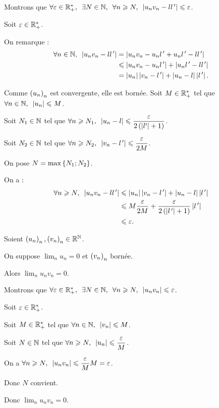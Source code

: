 \begin{dem}[3]
Montrons que \(\quantifs{\forall\epsilon\in\Rps;\exists N\in\N;\forall n\geq N}\abs{u_nv_n-ll\prim}\leq\epsilon\).

Soit \(\varepsilon\in\mathbb{R}_+^*\).

On remarque : \[\begin{aligned}
\quantifs{\forall n\in\N}\abs{u_nv_n-ll\prim}&=\abs{u_nv_n-u_nl\prim+u_nl\prim-ll\prim} \\
&\leq\abs{u_nv_n-u_nl\prim}+\abs{u_nl\prim-ll\prim} \\
&=\abs{u_n}\abs{v_n-l\prim}+\abs{u_n-l}\abs{l\prim}.
\end{aligned}\]

Comme \(\left(u_n\right)_n\) est convergente, elle est bornée. Soit \(M\in\mathbb{R}_+^*\) tel que \(\quantifs{\forall n\in\N}\abs{u_n}\leq M\).

Soit \(N_1\in\mathbb{N}\) tel que \(\quantifs{\forall n\geq N_1}\abs{u_n-l}\leq\dfrac{\epsilon}{2\paren{\abs{l'}+1}}\).

Soit \(N_2\in\mathbb{N}\) tel que \(\quantifs{\forall n\geq N_2}\abs{v_n-l\prim}\leq\dfrac{\epsilon}{2M}\).

On pose \(N=\max\left\lbrace N_1;N_2\right\rbrace\).

On a : \[\begin{aligned}
\quantifs{\forall n\geq N}\abs{u_nv_n-ll\prim}&\leq\abs{u_n}\abs{v_n-l\prim}+\abs{u_n-l}\abs{l\prim} \\
&\leq M\dfrac{\epsilon}{2M}+\dfrac{\epsilon}{2\paren{\abs{l\prim}+1}}\abs{l\prim} \\
&\leq\epsilon.
\end{aligned}\]
\end{dem}

\begin{prop}
Soient \(\left(u_n\right)_n,\left(v_n\right)_n\in\mathbb{R}^{\mathbb{N}}\).

On suppose \(\lim_nu_n=0\) et \(\left(v_n\right)_n\) bornée.

Alors \(\lim_nu_nv_n=0\).
\end{prop}

\begin{dem}
Montrons que \(\quantifs{\forall\epsilon\in\Rps;\exists N\in\N;\forall n\geq N}\abs{u_nv_n}\leq\epsilon\).

Soit \(\varepsilon\in\mathbb{R}_+^*\).

Soit \(M\in\mathbb{R}_+^*\) tel que \(\quantifs{\forall n\in\N}\abs{v_n}\leq M\).

Soit \(N\in\mathbb{N}\) tel que \(\quantifs{\forall n\geq N}\abs{u_n}\leq\dfrac{\epsilon}{M}\).

On a \(\quantifs{\forall n\geq N}\abs{u_nv_n}\leq\dfrac{\epsilon}{M}M=\epsilon\).

Donc \(N\) convient.

Donc \(\lim_nu_nv_n=0\).
\end{dem}

